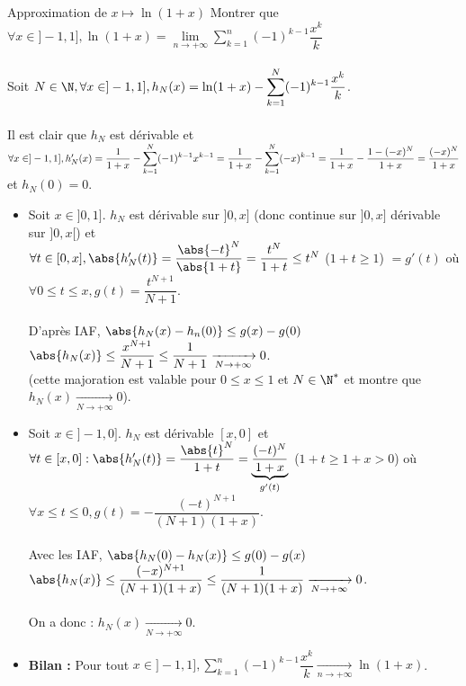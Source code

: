 \documentclass[12pt,a4paper]{report}
\begin{document}
\begin{application}{Approximation de $x \mapsto \ln(1+x)$}{}
Montrer que $\forall x \in ]-1,1], \ln(1+x) = \underset{n \to +\infty}{\lim} \displaystyle{\sum_{k=1}^{n} (-1)^{k-1}\dfrac{x^k}{k}}$ \\ \\
Soit $N \in \N, \forall x \in ]-1,1], h_N(x) = \ln(1+x)-\displaystyle{\sum_{k=1}^{N} (-1)^{k-1}\dfrac{x^k}{k}}$. \\ \\
Il est clair que $h_N$ est dérivable et $\forall x \in ]-1,1], \\ \\
h'_N(x) = \dfrac{1}{1+x} - \displaystyle{\sum_{k=1}^{N}(-1)^{k-1}x^{k-1}} = \dfrac{1}{1+x} - \displaystyle{\sum_{k=1}^{N} (-x)^{k-1}} = \dfrac{1}{1+x} - \dfrac{1-(-x)^N}{1+x} = \dfrac{(-x)^N}{1+x}$ \\
et $h_N(0) = 0$. \\
\begin{itemize}
	\item Soit $x \in ]0,1]$. $h_N$ est dérivable sur $]0,x]$ (donc continue sur $]0,x]$ dérivable sur $]0,x[$) et \\
	$\forall t \in [0,x], \abs{h'_N(t)} = \dfrac{\abs{-t}^N}{\abs{1+t}} = \dfrac{t^N}{1+t} \leq t^N$ ($1+t \geq 1$) $= g'(t)$ où $\forall 0 \leq t \leq x, g(t) = \dfrac{t^{N+1}}{N+1}$. \\ \\
	D'après IAF, $\abs{h_N(x)-h_n(0)} \leq g(x)-g(0)$ \ie $\abs{h_N(x)} \leq \dfrac{x^{N+1}}{N+1} \leq \dfrac{1}{N+1} \xrightarrow[N \to +\infty]{} 0$. \\
	(cette majoration est valable pour $0 \leq x \leq 1$ et $N \in \N^*$ et montre que $h_N(x) \xrightarrow[N \to +\infty]{} 0$). \\
	
	\item Soit $x \in ]-1,0]$. $h_N$ est dérivable $[x,0]$ et $\forall t \in [x,0] : \\
	\abs{h'_N(t)} = \dfrac{\abs{t}^N}{1+t} = \underbrace{\dfrac{(-t)^N}{1+x}}_{g'(t)}$ ($1+t \geq 1+x > 0$) où $\forall x \leq t \leq 0, g(t) = - \dfrac{(-t)^{N+1}}{(N+1)(1+x)}$. \\ \\
	Avec les IAF, $\abs{h_N(0) - h_N(x)} \leq g(0)-g(x)$ \\
	\ie $\abs{h_N(x)} \leq \dfrac{(-x)^{N+1}}{(N+1)(1+x)} \leq \dfrac{1}{(N+1)(1+x)} \xrightarrow[N \to +\infty]{}0$. \\ \\
	On a donc : $h_N(x) \xrightarrow[N \to +\infty]{} 0$.
	
	\item \textbf{Bilan :} Pour tout $x \in ]-1,1], \displaystyle{\sum_{k=1}^{n} (-1)^{k-1}\dfrac{x^k}{k}} \xrightarrow[n \to +\infty]{} \ln(1+x)$.
\end{itemize}
\end{application}
\end{document}
